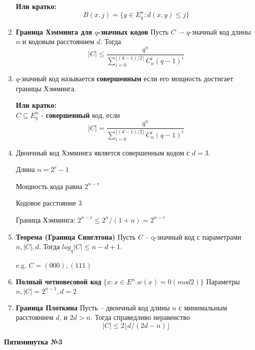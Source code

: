 \documentclass[a4paper, 12pt]{report}
\begin{document}
\begin{enumerate}
\textbf{Или кратко:}\\
\[B(x,j) = \lbrace y\in E_{q}^{n} : d(x,y) \leq j\rbrace\]

\item \textbf{Граница Хэмминга для $q$-значных кодов}
Пусть $C$ –- $q$-значный код длины $n$ и кодовым расстоянием $d$.
Тогда
\[  |C| \leq \frac {q^n} {{\sum_{i = 0}^{\lfloor(d - 1)/2\rfloor} C_n^i (q - 1)^i}} \]

\item
$q$-значный код называется \textbf{совершенным} если его мощность
достигает границы Хэмминга.

\textbf{Или кратко:}\\
$C \subseteq E_{q}^{n}$ - \textbf{совершенный} код, если 
\[|C| = \frac {q^n} {{\sum_{i = 0}^{\lfloor(d - 1)/2\rfloor} C_n^i (q - 1)^i}} \] 

\item 
Двоичный код Хэмминга является совершенным кодом с $d = 3$.

Длина $n = 2^r - 1$

Мощность кода равна $2^{n-r}$

Кодовое расстояние $3$

Граница Хэмминга: $2^{n-r} \leq 2^n/(1 + n) = 2^{n-r}$

\newpage

\item \textbf{Теорема (Граница Синглтона)}
Пусть $C$ – q-значный код с параметрами $n, |C|, d$. Тогда
$log_{q}|C| \leq n - d + 1$.

e.g. $C = {(000),(111)}$


\item \textbf{Полный четновесовой код}
$\{x : x \in E^n. w(x) = 0(mod 2)\}$
Параметры $n, |C| = 2^{n - 1}, d = 2$

\item \textbf{Граница Плоткина}
Пусть – двоичный код длины $n$ с минимальным расстоянием
$d$, и $2d > n$. Тогда справедливо неравенство
\[ |C| \leq 2 \lfloor   d/(2d - n) \rfloor \]

\end{enumerate}

\textbf{Пятиминутка №3}
\end{document}

